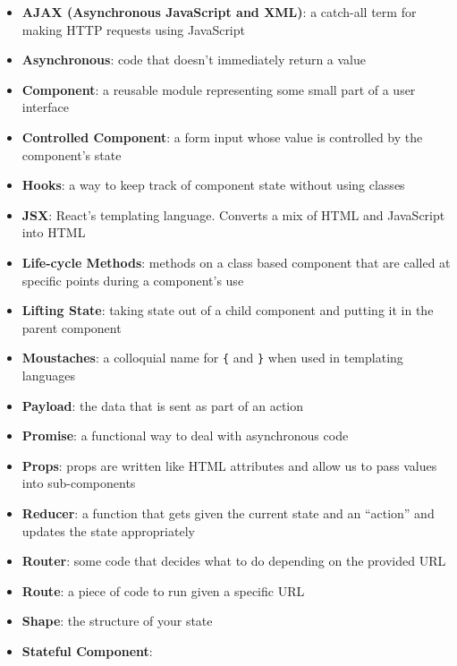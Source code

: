\begin{itemize}[leftmargin=*]
    \item
        \textbf{AJAX (Asynchronous JavaScript and XML)}:
        a catch-all term for making HTTP requests using JavaScript
    \item
        \textbf{Asynchronous}:
        code that doesn't immediately return a value
    \item
        \textbf{Component}:
        a reusable module representing some small part of a user interface
    \item
        \textbf{Controlled Component}:
        a form input whose value is controlled by the component's state
    \item
        \textbf{Hooks}:
        a way to keep track of component state without using classes
    \item
        \textbf{JSX}:
        React's templating language. Converts a mix of HTML and JavaScript into HTML
    \item
        \textbf{Life-cycle Methods}:
        methods on a class based component that are called at specific points during a component's use
    \item
        \textbf{Lifting State}:
        taking state out of a child component and putting it in the parent component
    \item
        \textbf{Moustaches}:
        a colloquial name for \texttt{\{} and \texttt{\}} when used in templating languages
    \item
        \textbf{Payload}:
        the data that is sent as part of an action
    \item
        \textbf{Promise}:
        a functional way to deal with asynchronous code
    \item
        \textbf{Props}:
        props are written like HTML attributes and allow us to pass values into sub-components
    \item
        \textbf{Reducer}:
        a function that gets given the current state and an ``action'' and updates the state appropriately
    \item
        \textbf{Router}:
        some code that decides what to do depending on the provided URL
    \item
        \textbf{Route}:
        a piece of code to run given a specific URL
    \item
        \textbf{Shape}:
        the structure of your state
    \item
        \textbf{Stateful Component}:

\end{itemize}
